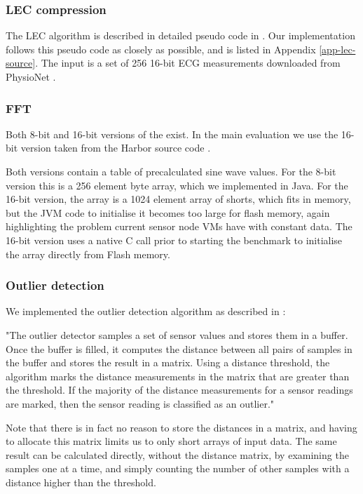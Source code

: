 \subsubsection{LEC compression}
The LEC algorithm is described in detailed pseudo code in \cite{Marcelloni:2009ja}. Our implementation follows this pseudo code as closely as possible, and is listed in Appendix \ref{app-lec-source}. The input is a set of 256 16-bit ECG measurements downloaded from PhysioNet \cite{physionet-ecg-data}.


\subsubsection{FFT}
Both 8-bit and 16-bit versions of the  exist. In the main evaluation we use the 16-bit version taken from the Harbor source code \cite{sos-operating-system}.

Both versions contain a table of precalculated sine wave values. For the 8-bit version this is a 256 element byte array, which we implemented in Java. For the 16-bit version, the array is a 1024 element array of shorts, which fits in memory, but the JVM code to initialise it becomes too large for flash memory, again highlighting the problem current sensor node VMs have with constant data. The 16-bit version uses a native C call prior to starting the benchmark to initialise the array directly from Flash memory.

\subsubsection{Outlier detection}
We implemented the outlier detection algorithm as described in \cite{Kumar:2007ge}:

\begin{displayquote}
"The outlier detector samples a set of sensor values and stores them in a buffer. Once the buffer is filled, it computes the distance between all pairs of samples in the buffer and stores the result in a matrix. Using a distance threshold, the algorithm marks the distance measurements in the matrix that are greater than the threshold. If the majority of the distance measurements for a sensor readings are marked, then the sensor reading is classified as an outlier."
\end{displayquote}

Note that there is in fact no reason to store the distances in a matrix, and having to allocate this matrix limits us to only short arrays of input data. The same result can be calculated directly, without the distance matrix, by examining the samples one at a time, and simply counting the number of other samples with a distance higher than the threshold.


